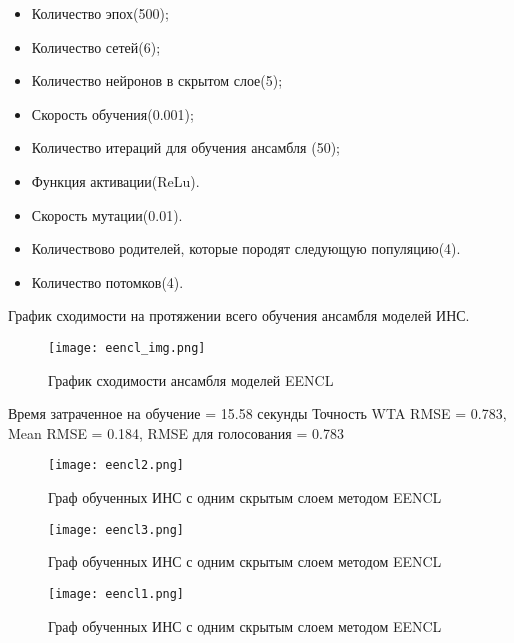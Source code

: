 \documentclass[12pt]{extarticle}
\begin{document}
\begin{itemize}
    \item Количество эпох(500);
    \item Количество сетей(6);
    \item Количество нейронов в скрытом слое(5);
    \item Скорость обучения(0.001);
    \item Количество итераций для обучения ансамбля (50);
    \item Функция активации(ReLu).
    \item Скорость мутации(0.01).
    \item Количествово родителей, которые породят следующую популяцию(4).
    \item Количество потомков(4).
\end{itemize}

График сходимости на протяжении всего обучения ансамбля моделей ИНС.

\begin{figure}[H]
    \centering
    \texttt{[image: eencl\_img.png]} %
    \caption{График сходимости ансамбля моделей EENCL}
    \label{fig:example}
\end{figure}

\FloatBarrier %

Время затраченное на обучение = 15.58 секунды  Точность WTA RMSE = 0.783, Mean RMSE = 0.184, RMSE для голосования = 0.783

\begin{figure}[H]
    \centering
    \texttt{[image: eencl2.png]} %
    \caption{Граф обученных ИНС с одним скрытым слоем методом EENCL}
    \label{fig:example}
\end{figure}

\begin{figure}[H]
    \centering
    \texttt{[image: eencl3.png]} %
    \caption{Граф обученных ИНС с одним скрытым слоем методом EENCL}
    \label{fig:example}
\end{figure}

\begin{figure}[H]
    \centering
    \texttt{[image: eencl1.png]} %
    \caption{Граф обученных ИНС с одним скрытым слоем методом EENCL}
    \label{fig:example}
\end{figure}
\end{document}
